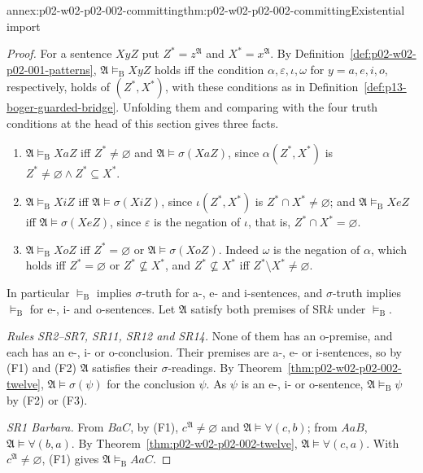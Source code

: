 \begin{annexitem}{annex:p02-w02-p02-002-committing}{thm:p02-w02-p02-002-committing}{Existential import}
\begin{proof}
For a sentence \(XyZ\) put \(Z^\ast=z^{\mathfrak A}\) and
\(X^\ast=x^{\mathfrak A}\). By Definition~\ref{def:p02-w02-p02-001-patterns},
\(\mathfrak A\models_{\mathrm B}XyZ\) holds iff the condition
\(\alpha,\varepsilon,\iota,\omega\) for \(y=a,e,i,o\), respectively, holds of
\((Z^\ast,X^\ast)\), with these conditions as in
Definition~\ref{def:p13-boger-guarded-bridge}. Unfolding them and comparing
with the four truth conditions at the head of this section gives three facts.
\begin{enumerate}
\item[(F1)] \(\mathfrak A\models_{\mathrm B}XaZ\) iff \(Z^\ast\ne\varnothing\)
 and \(\mathfrak A\models\sigma(XaZ)\), since
 \(\alpha(Z^\ast,X^\ast)\) is \(Z^\ast\ne\varnothing\land Z^\ast\subseteq X^\ast\).
\item[(F2)] \(\mathfrak A\models_{\mathrm B}XiZ\) iff
 \(\mathfrak A\models\sigma(XiZ)\), since \(\iota(Z^\ast,X^\ast)\) is
 \(Z^\ast\cap X^\ast\ne\varnothing\); and
 \(\mathfrak A\models_{\mathrm B}XeZ\) iff \(\mathfrak A\models\sigma(XeZ)\),
 since \(\varepsilon\) is the negation of \(\iota\), that is,
 \(Z^\ast\cap X^\ast=\varnothing\).
\item[(F3)] \(\mathfrak A\models_{\mathrm B}XoZ\) iff \(Z^\ast=\varnothing\)
 or \(\mathfrak A\models\sigma(XoZ)\). Indeed \(\omega\) is the negation of
 \(\alpha\), which holds iff \(Z^\ast=\varnothing\) or
 \(Z^\ast\not\subseteq X^\ast\), and \(Z^\ast\not\subseteq X^\ast\) iff
 \(Z^\ast\setminus X^\ast\ne\varnothing\).
\end{enumerate}
In particular \(\models_{\mathrm B}\) implies \(\sigma\)-truth for a-,
e- and i-sentences, and \(\sigma\)-truth implies \(\models_{\mathrm B}\) for e-,
i- and o-sentences. Let \(\mathfrak A\) satisfy both premises of SR\(k\)
under \(\models_{\mathrm B}\).

\emph{Rules SR2--SR7, SR11, SR12 and SR14.} None of them has an o-premise,
and each has an e-, i- or o-conclusion. Their premises are a-, e- or i-sentences, so by (F1) and (F2)
\(\mathfrak A\) satisfies their \(\sigma\)-readings. By
Theorem~\ref{thm:p02-w02-p02-002-twelve}, \(\mathfrak A\models\sigma(\psi)\)
for the conclusion \(\psi\). As \(\psi\) is an e-, i- or o-sentence,
\(\mathfrak A\models_{\mathrm B}\psi\) by (F2) or (F3).

\emph{SR1 Barbara.} From \(BaC\), by (F1), \(c^{\mathfrak A}\ne\varnothing\)
and \(\mathfrak A\models\forall(c,b)\); from \(AaB\),
\(\mathfrak A\models\forall(b,a)\). By
Theorem~\ref{thm:p02-w02-p02-002-twelve}, \(\mathfrak A\models\forall(c,a)\).
With \(c^{\mathfrak A}\ne\varnothing\), (F1) gives
\(\mathfrak A\models_{\mathrm B}AaC\).


\end{proof}
\end{annexitem}
